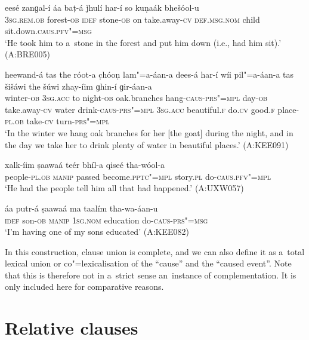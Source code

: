 \begin{exe}
\ex
\label{ex:13-184}
\gll eesé zanɡal-í áa baṭ-á ǰhulí har-í  so kuṇaák bhešóol-u \\
\textsc{3sg.rem.ob} forest-\textsc{ob} \textsc{idef} stone-\textsc{ob} on take.away-\textsc{cv} \textsc{def.msg.nom} child sit.down.\textsc{caus}.\textsc{pfv"=msg} \\
\glt `He took him to a~stone in the forest and put him down (i.e., had him sit).' (A:BRE005)

\ex
\label{ex:13-185}
\gll heewand-á tas the róot-a c̣hóoṇ  lam"=a-áan-a dees-á har-í wíi
pil"=a-áan-a tas šišáwi the šúwi zhay-íim  ɡhin-í ɡir-áan-a \\
winter-\textsc{ob}  \textsc{3sg.acc}  to night-\textsc{ob} oak.branches  hang-\textsc{caus}-\textsc{prs"=mpl} day-\textsc{ob} take.away-\textsc{cv} water  drink-\textsc{caus}-\textsc{prs"=mpl} \textsc{3sg.acc} beautiful.\textsc{f} do.\textsc{cv} good.\textsc{f} place-\textsc{pl.ob} take-\textsc{cv} turn-\textsc{prs"=mpl} \\
\glt `In the winter we hang oak branches for her [the goat] during the night, and in the day we take her to drink plenty of water in beautiful places.' (A:KEE091)

\ex
\label{ex:13-186}
\gll xalk-íim ṣaawaá teér bhíl-a qiseé  tha-wóol-a \\
people-\textsc{pl.ob} \textsc{manip} passed become.\textsc{pptc"=mpl} story.\textsc{pl} do-\textsc{caus}.\textsc{pfv"=mpl} \\
\glt `He had the people tell him all that had happened.' (A:UXW057)

\ex
\label{ex:13-187}
\gll áa putr-á ṣaawaá ma taalím tha-wa-áan-u  \\
\textsc{idef} son-\textsc{ob} \textsc{manip} \textsc{1sg.nom} education do-\textsc{caus}-\textsc{prs"=msg} \\
\glt `I'm having one of my sons educated' (A:KEE082) 
\end{exe}

In this construction, clause union is complete, and we can also define it as a~total lexical union \citep[86]{noonan2007} or co"=lexicalisation of the ``cause'' and the ``caused event''. Note that this is therefore not in a~strict sense an~instance of complementation. It is only included here for comparative reasons.


\section{Relative clauses}
\label{sec:13-6}

